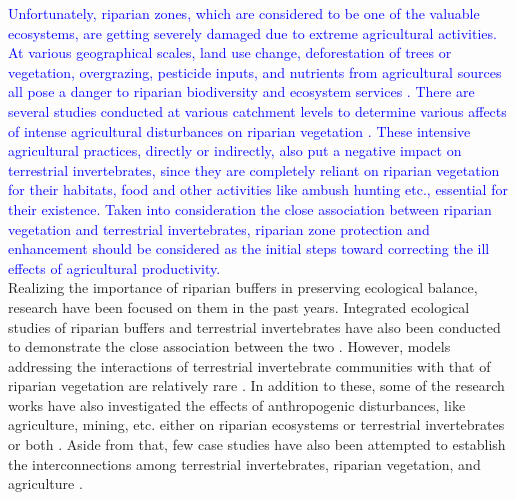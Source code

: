 \documentclass[12pt]{article}
\numberwithin{equation}{section}
\begin{document}
\textcolor{blue}{Unfortunately, riparian zones, which are considered to be one of the valuable ecosystems, are getting severely damaged due to extreme agricultural activities. At various geographical scales, land use change, deforestation of trees or vegetation, overgrazing, pesticide inputs, and nutrients from agricultural sources all pose a danger to riparian biodiversity and ecosystem services \cite{burdon2013habitat}. There are several studies conducted at various catchment levels to determine various affects of intense agricultural disturbances on riparian vegetation \citep{cesarini2022riparian,alemu2018identifying, heartsill2003riparian, corbacho2003patterns, schlosser1981riparian}.} \textcolor{blue}{These intensive agricultural practices, directly or indirectly, also put a negative impact on terrestrial invertebrates, since they are completely reliant on riparian vegetation for their habitats, food and other activities like ambush hunting etc., essential for their existence. Taken into consideration the close association between riparian vegetation and terrestrial invertebrates, riparian zone protection and enhancement should be considered as the initial steps toward correcting the ill effects of agricultural productivity.}\\
Realizing the importance of riparian buffers in preserving ecological balance, research have been focused on them in the past years. Integrated ecological studies of riparian buffers and terrestrial invertebrates have also been conducted to demonstrate the close association between the two \citep{forio2020small, flory1999, kawaguchi2001}. However, models addressing the interactions of terrestrial invertebrate communities with that of riparian vegetation are relatively rare \citep{steward2022, wipfli1997, sabo2002}. In addition to these, some of the research works have also investigated the effects of anthropogenic disturbances, like agriculture, mining, etc. either on riparian ecosystems or terrestrial invertebrates or both \citep{you2015, burdon2020}. Aside from that, few case studies have also been attempted to establish the interconnections among terrestrial invertebrates, riparian vegetation, and agriculture \citep{popescu2021riparian, delong1998, connolly2016, moore2005}.\\
\end{document}
